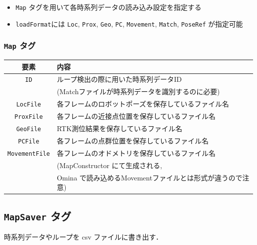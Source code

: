 \documentclass[dvipdfmx]{jsarticle}
\begin{document}
\begin{itemize}
	\item \verb|Map| タグを用いて各時系列データの読み込み設定を指定する
	\item \verb|loadFormat|には \verb|Loc|, \verb|Prox|, \verb|Geo|, \verb|PC|, \verb|Movement|, \verb|Match|, \verb|PoseRef| が指定可能
\end{itemize}

\cprotect \subsubsection{\verb|Map| タグ}
\begin{tabular}{c|l}
	\hline
	要素 & 内容 \\
	\hline \hline
	\verb|ID|  & ループ検出の際に用いた時系列データID \vspace{-5pt} \\
		& (Matchファイルが時系列データを識別するのに必要) \\
	\verb|LocFile|  & 各フレームのロボットポーズを保存しているファイル名 \\
	\verb|ProxFile|  & 各フレームの近接点位置を保存しているファイル名 \\
	\verb|GeoFile|  & RTK測位結果を保存しているファイル名 \\
	\verb|PCFile|  & 各フレームの点群位置を保存しているファイル名 \\
	\verb|MovementFile|  & 各フレームのオドメトリを保存しているファイル名 \vspace{-5pt}\\
		& (MapConstructor にて生成される, \vspace{-5pt}\\
		& Omina で読み込めるMovementファイルとは形式が違うので注意) \\
	\hline
\end{tabular}

\clearpage
\cprotect \subsection{\verb|MapSaver| タグ}
時系列データやループを csv ファイルに書き出す．
\end{document}
